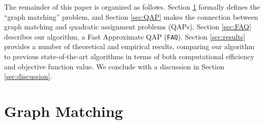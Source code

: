 \documentclass[11pt]{article}
\begin{document}
The remainder of this paper is organized as follows.  Section \ref{sec:GM} formally defines the ``graph matching'' problem, and Section \ref{sec:QAP} makes the connection between graph matching and quadratic assignment problems (QAPs).  Section \ref{sec:FAQ} describes our algorithm, a Fast Approximate QAP (\texttt{FAQ}).  Section \ref{sec:results} provides a number of theoretical and empirical results, comparing our algorithm to previous state-of-the-art algorithms in terms of both computational efficiency and objective function value.  We conclude with a discussion in Section \ref{sec:discussion}.




\section{Graph Matching} %
\label{sec:GM}
\end{document}
